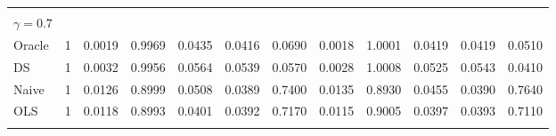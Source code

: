 \begin{tabular}{llllllllllll}
\multicolumn{1}{l}{} &
  \multicolumn{1}{|r}{} &
  \multicolumn{1}{r}{} &
  \multicolumn{1}{r}{} &
  \multicolumn{1}{r}{} &
  \multicolumn{1}{r}{} &
  \multicolumn{1}{r}{} &
  \multicolumn{1}{r}{} &
  \multicolumn{1}{r}{} &
  \multicolumn{1}{r}{} &
  \multicolumn{1}{r}{} &
  \multicolumn{1}{r}{} \\
\multicolumn{1}{l}{$\gamma = 0.7$} &
  \multicolumn{1}{|r}{} &
  \multicolumn{1}{r}{} &
  \multicolumn{1}{r}{} &
  \multicolumn{1}{r}{} &
  \multicolumn{1}{r}{} &
  \multicolumn{1}{r}{} &
  \multicolumn{1}{r}{} &
  \multicolumn{1}{r}{} &
  \multicolumn{1}{r}{} &
  \multicolumn{1}{r}{} &
  \multicolumn{1}{r}{} \\
\multicolumn{1}{l}{\hspace{1em}Oracle} &
  \multicolumn{1}{|r}{1} &
  \multicolumn{1}{r}{0.0019} &
  \multicolumn{1}{r}{0.9969} &
  \multicolumn{1}{r}{0.0435} &
  \multicolumn{1}{r}{0.0416} &
  \multicolumn{1}{r}{0.0690} &
  \multicolumn{1}{r}{0.0018} &
  \multicolumn{1}{r}{1.0001} &
  \multicolumn{1}{r}{0.0419} &
  \multicolumn{1}{r}{0.0419} &
  \multicolumn{1}{r}{0.0510} \\
\multicolumn{1}{l}{\hspace{1em}DS} &
  \multicolumn{1}{|r}{1} &
  \multicolumn{1}{r}{0.0032} &
  \multicolumn{1}{r}{0.9956} &
  \multicolumn{1}{r}{0.0564} &
  \multicolumn{1}{r}{0.0539} &
  \multicolumn{1}{r}{0.0570} &
  \multicolumn{1}{r}{0.0028} &
  \multicolumn{1}{r}{1.0008} &
  \multicolumn{1}{r}{0.0525} &
  \multicolumn{1}{r}{0.0543} &
  \multicolumn{1}{r}{0.0410} \\
\multicolumn{1}{l}{\hspace{1em}Naive} &
  \multicolumn{1}{|r}{1} &
  \multicolumn{1}{r}{0.0126} &
  \multicolumn{1}{r}{0.8999} &
  \multicolumn{1}{r}{0.0508} &
  \multicolumn{1}{r}{0.0389} &
  \multicolumn{1}{r}{0.7400} &
  \multicolumn{1}{r}{0.0135} &
  \multicolumn{1}{r}{0.8930} &
  \multicolumn{1}{r}{0.0455} &
  \multicolumn{1}{r}{0.0390} &
  \multicolumn{1}{r}{0.7640} \\
\multicolumn{1}{l}{\hspace{1em}OLS} &
  \multicolumn{1}{|r}{1} &
  \multicolumn{1}{r}{0.0118} &
  \multicolumn{1}{r}{0.8993} &
  \multicolumn{1}{r}{0.0401} &
  \multicolumn{1}{r}{0.0392} &
  \multicolumn{1}{r}{0.7170} &
  \multicolumn{1}{r}{0.0115} &
  \multicolumn{1}{r}{0.9005} &
  \multicolumn{1}{r}{0.0397} &
  \multicolumn{1}{r}{0.0393} &
  \multicolumn{1}{r}{0.7110} \\
\multicolumn{1}{l}{} &
  \multicolumn{1}{|r}{} &
  \multicolumn{1}{r}{} &
  \multicolumn{1}{r}{} &

\end{tabular}
